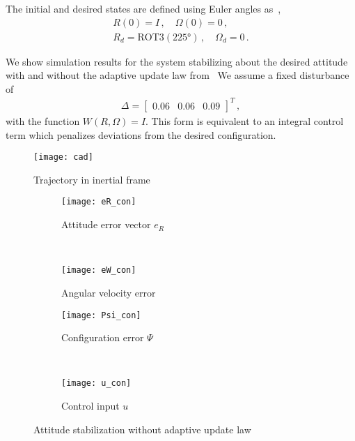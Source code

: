 \documentclass[letterpaper, 10 pt, conference]{ieeeconf}  %
\begin{document}
The initial and desired states are defined using Euler angles as~\cite{shuster1993},
\begin{gather*}
	R(0) = I \, , \quad \Omega(0) = 0 \, ,\\
	R_d = \text{ROT3}(\ang{225}) \, , \quad \Omega_d = 0 \, .
\end{gather*}

We show simulation results for the system stabilizing about the desired attitude with and without the adaptive update law from~
We assume a fixed disturbance of 
\begin{gather*}
	\Delta = \begin{bmatrix} 0.06 & 0.06 & 0.09 \end{bmatrix}^T \, ,
\end{gather*}
with the function \( W(R,\Omega) = I \).
This form is equivalent to an integral control term which penalizes deviations from the desired configuration.
\begin{figure}
	\texttt{[image: cad]}
	\caption{Trajectory in inertial frame\label{fig:cad}}
\end{figure}
\begin{figure} 
	\centering 
	\begin{subfigure}[htbp]{0.5\columnwidth} 
		\texttt{[image: eR\_con]} 
		\caption{Attitude error vector \(e_R\) } \label{fig:eR_con} 
	\end{subfigure}~ %
	\begin{subfigure}[htbp]{0.5\columnwidth} 
		\texttt{[image: eW\_con]} 
		\caption{Angular velocity error} \label{fig:eW_con} 
	\end{subfigure} 
	
	\begin{subfigure}[htbp]{0.5\columnwidth} 
		\texttt{[image: Psi\_con]} 
		\caption{Configuration error \( \Psi \)} \label{fig:Psi_con} 
	\end{subfigure}~
	\begin{subfigure}[htbp]{0.5\columnwidth} 
		\texttt{[image: u\_con]} 
		\caption{Control input \( u\)} \label{fig:u_con} 
	\end{subfigure} 
	\caption{Attitude stabilization without adaptive update law}
	\label{fig:con} 
\end{figure}
\end{document}
